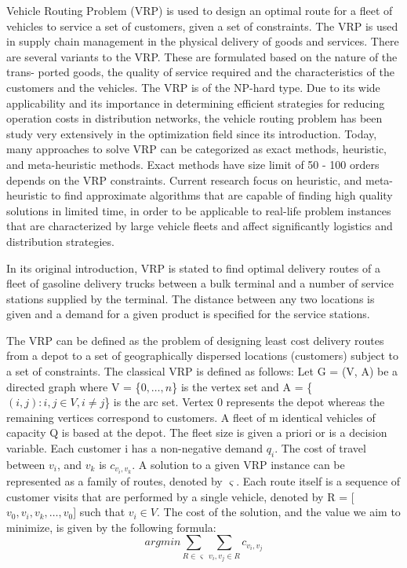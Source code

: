 \documentclass[../main.tex]{}
\begin{document}
 Vehicle Routing Problem (VRP) is used to design an optimal route for a fleet of vehicles to service a set of customers, given a set of constraints. The VRP is used in supply chain management in the physical delivery of goods and services. There are several variants to the VRP. These are formulated based on the nature of the trans- ported goods, the quality of service required and the characteristics of the customers and the vehicles. The VRP is of the NP-hard type.
Due to its wide applicability and its importance in determining efficient strategies for reducing operation costs in distribution networks, the vehicle routing problem has been study very extensively in the optimization field since its introduction. Today, many approaches to solve VRP can be categorized as exact methods, heuristic, and meta-heuristic methods. Exact methods have size limit of 50 - 100 orders depends on the VRP constraints. Current research focus on heuristic, and meta-heuristic to find approximate algorithms that are capable of finding high quality solutions in limited time, in order to be applicable to real-life problem instances that are characterized by large vehicle fleets and affect significantly logistics and distribution strategies.

In its original introduction, VRP is stated to find optimal delivery routes of a fleet of gasoline delivery trucks between a bulk terminal and a number of service stations supplied by the terminal. The distance between any two locations is given and a demand for a given product is specified for the service stations.

The VRP can be defined as the problem of designing least cost delivery routes from a depot to a set of geographically dispersed locations (customers) subject to a set of constraints.
The classical VRP is defined as follows: Let G = (V, A) be a directed graph where V = \{$0, \ldots ,n$\} is the vertex set and A = \{$(i,j) : i,j \in V, i \neq j$\} is the arc set. Vertex 0 represents the depot whereas the remaining vertices correspond to customers. A fleet of m identical vehicles of capacity Q is based at the depot. The fleet size is given a priori or is a decision variable. Each customer i has a non-negative demand $q_i$. The cost of travel between $v_i$, and $v_k$ is $c_{v_i, v_k}$. A solution to a given VRP instance can be represented as a family of routes, denoted by $\varsigma$. Each route itself is a sequence of customer visits that are performed by a single vehicle, denoted by R = [$v_0,v_i, v_k, \ldots, v_0$] such that $v_i \in V$. The cost of the solution, and the value we aim to minimize, is given by the following formula:
\begin{equation}
argmin \sum_{R \in \varsigma} \sum_{v_i, v_j \in R} c_{v_i, v_j} \nonumber
\end{equation}
\end{document}
